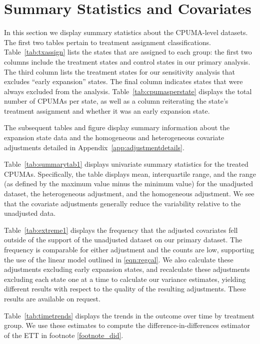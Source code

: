 \section{Summary Statistics and Covariates}\label{app:sumstats}

In this section we display summary statistics about the CPUMA-level datasets. The first two tables pertain to treatment assignment classifications. Table~\ref{tab:txassign} lists the states that are assigned to each group: the first two columns include the treatment states and control states in our primary analysis. The third column lists the treatment states for our sensitivity analysis that excludes ``early expansion'' states. The final column indicates states that were always excluded from the analysis. Table~\ref{tab:cpumasperstate} displays the total number of CPUMAs per state, as well as a column reiterating the state's treatment assignment and whether it was an early expansion state.

The subsequent tables and figure display summary information about the expansion state data and the homogeneous and heterogeneous covariate adjustments detailed in Appendix~\ref{app:adjustmentdetails}. 

Table~\ref{tab:summarytab1} displays univariate summary statistics for the treated CPUMAs. Specifically, the table displays mean, interquartile range, and the range (as defined by the maximum value minus the minimum value) for the unadjusted dataset, the heterogeneous adjustment, and the homogeneous adjustment. We see that the covariate adjustments generally reduce the variability relative to the unadjusted data. 

Table~\ref{tab:extreme1} displays the frequency that the adjusted covariates fell outside of the support of the unadjusted dataset on our primary dataset. The frequency is comparable for either adjustment and the counts are low, supporting the use of the linear model outlined in \eqref{eqn:regcal}. We also calculate these adjustments excluding early expansion states, and recalculate these adjustments excluding each state one at a time to calculate our variance estimates, yielding different results with respect to the quality of the resulting adjustments. These results are available on request.

Table~\ref{tab:timetrends} displays the trends in the outcome over time by treatment group. We use these estimates to compute the difference-in-differences estimator of the ETT in footnote \ref{footnote_did}. 

